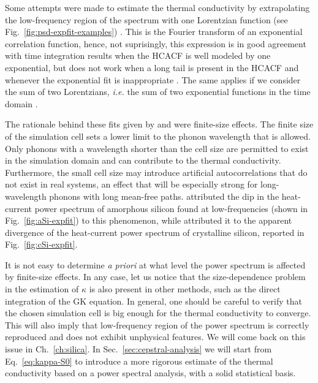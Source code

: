 \begin{LEtext}
Some attempts were made to estimate the thermal conductivity by extrapolating the low-frequency region of the spectrum with one Lorentzian function (see Fig.~\ref{fig:psd-expfit-examples}) \cite{Lee1991,Volz2000}.
This is the Fourier transform of an exponential correlation function, hence, not suprisingly, this expression is in good agreement with time integration results when the HCACF is well modeled by one exponential, but does not work when a long tail is present in the HCACF and whenever the exponential fit is inappropriate \cite{Schelling2002}. The same applies if we consider the sum of two Lorentzians, \emph{i.e.} the sum of two exponential functions in the time domain \cite{Hirosaki2002}. 

The rationale behind these fits given by \citet{Lee1991} and \cite{Volz2000} were finite-size effects. 
The finite size of the simulation cell sets a lower limit to the phonon wavelength that is allowed. Only phonons with a wavelength shorter than the cell size are permitted to exist in the simulation domain and can contribute to the thermal conductivity.
Furthermore, the small cell size may introduce artificial autocorrelations that do not exist in real systems, an effect that will be especially strong for long-wavelength phonons with long mean-free paths. 
\citet{Lee1991} attributed the dip in the heat-current power spectrum of amorphous silicon found at low-frequencies (shown in Fig.~\ref{fig:aSi-expfit}) to this phenomenon, while \citet{Volz2000} attributed it to the apparent divergence of the heat-current power spectrum of crystalline silicon, reported in Fig.~\ref{fig:cSi-expfit}.

It is not easy to determine \emph{a priori} at what level the power spectrum is affected by finite-size effects. In any case, let us notice that the size-dependence problem in the estimation of $\kappa$ is also present in other methods, such as the direct integration of the GK equation. In general, one should be careful to verify that the chosen simulation cell is big enough for the thermal conductivity to converge. This will also imply that low-frequency region of the power spectrum is correctly reproduced and does not exhibit unphysical features. We will come back on this issue in Ch.~\ref{ch:silica}. 
In Sec.~\ref{sec:cepstral-analysis} we will start from Eq.~\eqref{eq:kappa-S0} to introduce a more rigorous estimate of the thermal conductivity based on a power spectral analysis, with a solid statistical basis.



\end{LEtext}
